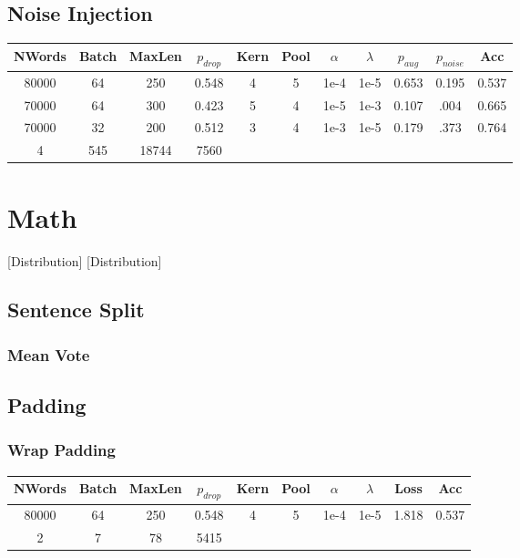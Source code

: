 \subsection{Noise Injection}
\begin{center}
 \begin{tabular}{||c c c c c c c c c c c||}
 \hline
 NWords & Batch & MaxLen & $p_{drop}$ & Kern & Pool & $\alpha$ & $\lambda$ & $p_{aug}$ & $p_{noise}$ & Acc\\ [0.5ex]
 \hline\hline
 80000 & 64 & 250 & 0.548 & 4 & 5 & 1e-4 & 1e-5 & 0.653 & 0.195 & 0.537\\
 \hline
 70000 & 64 & 300 & 0.423 & 5 & 4 & 1e-5 & 1e-3 & 0.107 & .004 & 0.665\\
 \hline
 70000 & 32 & 200 & 0.512 & 3 & 4 & 1e-3 & 1e-5 & 0.179 & .373 &  0.764\\
 \hline
 4 & 545 & 18744 & 7560 \\[1ex]
 \hline
\end{tabular}
\end{center}




%
%
\section{Math}
[Distribution]
[Distribution]
\subsection{Sentence Split}
\subsubsection{Mean Vote}

\subsection{Padding}
\subsubsection{Wrap Padding}
\begin{center}\begin{tabular}{||c c c c c c c c c c ||}
 \hline
 NWords & Batch & MaxLen & $p_{drop}$ & Kern & Pool & $\alpha$ & $\lambda$ &  Loss & Acc\\ [0.5ex]
 \hline\hline
 80000 & 64 & 250 & 0.548 & 4 & 5 & 1e-4 & 1e-5 & 1.818 & 0.537\\
 \hline
 2 & 7 & 78 & 5415 \\
 [1ex]\hline\end{tabular}\end{center}

